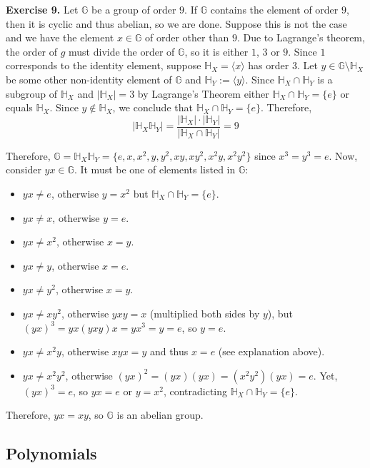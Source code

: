 \documentclass[../../book]{subfiles}
\begin{document}
\textbf{Exercise 9.} Let $\mathbb{G}$ be a group of order $9$. If $\mathbb{G}$
contains the element of order $9$, then it is cyclic and thus abelian, so we are
done. Suppose this is not the case and we have the element $x \in \mathbb{G}$ of
order other than $9$. Due to Lagrange's theorem, the order of $g$ must divide
the order of $\mathbb{G}$, so it is either $1$, $3$ or $9$. Since $1$
corresponds to the identity element, suppose $\mathbb{H}_X = \langle x\rangle$
has order $3$. Let $y \in \mathbb{G} \setminus \mathbb{H}_X$ be some other
non-identity element of $\mathbb{G}$ and $\mathbb{H}_Y := \langle y \rangle$.
Since $\mathbb{H}_X \cap \mathbb{H}_Y$ is a subgroup of $\mathbb{H}_X$ and
$|\mathbb{H}_X|=3$ by Lagrange's Theorem either $\mathbb{H}_X \cap
\mathbb{H}_Y=\{e\}$ or equals $\mathbb{H}_X$. Since $y \not\in \mathbb{H}_X$, we
conclude that $\mathbb{H}_X \cap \mathbb{H}_Y=\{e\}$. Therefore,
\begin{equation*}
    |\mathbb{H}_X\mathbb{H}_Y| = \frac{|\mathbb{H}_X|\cdot|\mathbb{H}_Y|}{|\mathbb{H}_X \cap \mathbb{H}_Y|} = 9
\end{equation*}

Therefore, $\mathbb{G} = \mathbb{H}_X\mathbb{H}_Y =
\{e,x,x^2,y,y^2,xy,xy^2,x^2y,x^2y^2\}$ since $x^3=y^3=e$. Now, consider $yx \in
\mathbb{G}$. It must be one of elements listed in $\mathbb{G}$:
\begin{itemize}
    \item $yx \neq e$, otherwise $y=x^2$ but $\mathbb{H}_X \cap \mathbb{H}_Y = \{e\}$.
    \item $yx \neq x$, otherwise $y=e$.
    \item $yx \neq x^2$, otherwise $x=y$.
    \item $yx \neq y$, otherwise $x=e$.
    \item $yx \neq y^2$, otherwise $x=y$.
    \item $yx \neq xy^2$, otherwise $yxy=x$ (multiplied both sides by $y$), but $(yx)^3=yx(yxy)x=yx^3=y=e$, so $y=e$.
    \item $yx \neq x^2y$, otherwise $xyx=y$ and thus $x=e$ (see explanation above).
    \item $yx \neq x^2y^2$, otherwise $(yx)^2=(yx)(yx)=(x^2y^2)(yx) = e$. Yet, $(yx)^3=e$, so $yx=e$ or $y=x^2$, contradicting $\mathbb{H}_X \cap \mathbb{H}_Y = \{e\}$.
\end{itemize} 

Therefore, $yx=xy$, so $\mathbb{G}$ is an abelian group.

\subsection*{Polynomials}
\end{document}
